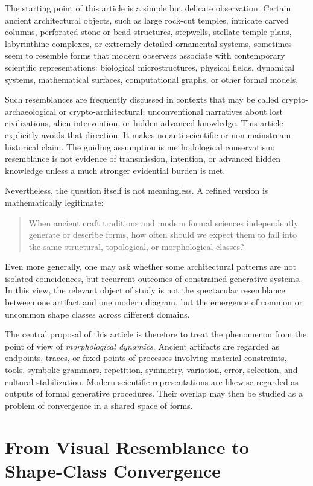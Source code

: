 The starting point of this article is a simple but delicate observation. Certain ancient architectural objects, such as large rock-cut temples, intricate carved columns, perforated stone or bead structures, stepwells, stellate temple plans, labyrinthine complexes, or extremely detailed ornamental systems, sometimes seem to resemble forms that modern observers associate with contemporary scientific representations: biological microstructures, physical fields, dynamical systems, mathematical surfaces, computational graphs, or other formal models.

Such resemblances are frequently discussed in contexts that may be called crypto-archaeological or crypto-architectural: unconventional narratives about lost civilizations, alien intervention, or hidden advanced knowledge. This article explicitly avoids that direction. It makes no anti-scientific or non-mainstream historical claim. The guiding assumption is methodological conservatism: resemblance is not evidence of transmission, intention, or advanced hidden knowledge unless a much stronger evidential burden is met.

Nevertheless, the question itself is not meaningless. A refined version is mathematically legitimate:
\begin{quote}
When ancient craft traditions and modern formal sciences independently generate or describe forms, how often should we expect them to fall into the same structural, topological, or morphological classes?
\end{quote}

Even more generally, one may ask whether some architectural patterns are not isolated coincidences, but recurrent outcomes of constrained generative systems. In this view, the relevant object of study is not the spectacular resemblance between one artifact and one modern diagram, but the emergence of common or uncommon shape classes across different domains.

The central proposal of this article is therefore to treat the phenomenon from the point of view of \emph{morphological dynamics}. Ancient artifacts are regarded as endpoints, traces, or fixed points of processes involving material constraints, tools, symbolic grammars, repetition, symmetry, variation, error, selection, and cultural stabilization. Modern scientific representations are likewise regarded as outputs of formal generative procedures. Their overlap may then be studied as a problem of convergence in a shared space of forms.

\section{From Visual Resemblance to Shape-Class Convergence}

